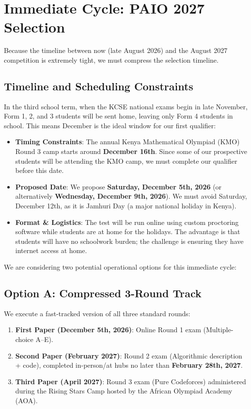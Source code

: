 \documentclass[11pt]{article}
\begin{document}
\section{Immediate Cycle: PAIO 2027 Selection}
Because the timeline between now (late August 2026) and the August 2027 competition is extremely tight, we must compress the selection timeline. 

\subsection{Timeline and Scheduling Constraints}
In the third school term, when the KCSE national exams begin in late November, Form 1, 2, and 3 students will be sent home, leaving only Form 4 students in school. This means December is the ideal window for our first qualifier:
\begin{itemize}
    \item \textbf{Timing Constraints}: The annual Kenya Mathematical Olympiad (KMO) Round 3 camp starts around \textbf{December 16th}. Since some of our prospective students will be attending the KMO camp, we must complete our qualifier before this date.
    \item \textbf{Proposed Date}: We propose \textbf{Saturday, December 5th, 2026} (or alternatively \textbf{Wednesday, December 9th, 2026}). We must avoid Saturday, December 12th, as it is Jamhuri Day (a major national holiday in Kenya).
    \item \textbf{Format \& Logistics}: The test will be run online using custom proctoring software while students are at home for the holidays. The advantage is that students will have no schoolwork burden; the challenge is ensuring they have internet access at home.
\end{itemize}

We are considering two potential operational options for this immediate cycle:

\subsection{Option A: Compressed 3-Round Track}
We execute a fast-tracked version of all three standard rounds:
\begin{enumerate}
    \item \textbf{First Paper (December 5th, 2026)}: Online Round 1 exam (Multiple-choice A--E).
    \item \textbf{Second Paper (February 2027)}: Round 2 exam (Algorithmic description + code), completed in-person/at hubs no later than \textbf{February 28th, 2027}.
    \item \textbf{Third Paper (April 2027)}: Round 3 exam (Pure Codeforces) administered during the Rising Stars Camp hosted by the African Olympiad Academy (AOA).
\end{enumerate}
\end{document}
